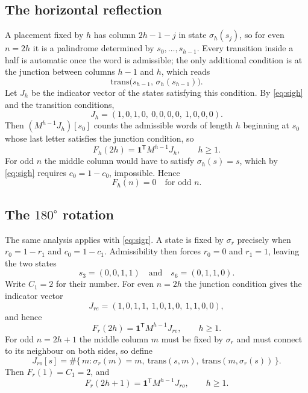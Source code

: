 \documentclass[12pt]{article}
\theoremstyle{definition}
\begin{document}
\subsection{The horizontal reflection}

A placement fixed by $h$ has column $2h-1-j$ in state $\sigma_h(s_j)$, so for
even $n = 2h$ it is a palindrome determined by $s_0, \dots, s_{h-1}$. Every
transition inside a half is automatic once the word is admissible; the only
additional condition is at the junction between columns $h-1$ and $h$, which
reads
\[
\text{trans}\bigl(s_{h-1},\, \sigma_h(s_{h-1})\bigr).
\]
Let $J_h$ be the indicator vector of the states satisfying this condition. By
\eqref{eq:sigh} and the transition conditions,
\[
J_h = (1,0,1,0,\ 0,0,0,0,\ 1,0,0,0).
\]
Then $(M^{h-1} J_h)[s_0]$ counts the admissible words of length $h$ beginning at
$s_0$ whose last letter satisfies the junction condition, so
\begin{equation}
\label{eq:Fh}
F_h(2h) = \mathbf{1}^{\mathsf{T}} M^{h-1} J_h,
\qquad h \ge 1 .
\end{equation}
For odd $n$ the middle column would have to satisfy $\sigma_h(s) = s$, which by
\eqref{eq:sigh} requires $c_0 = 1 - c_0$, impossible. Hence
\begin{equation}
\label{eq:Fhodd}
F_h(n) = 0 \quad \text{for odd } n .
\end{equation}

\subsection{The $180^\circ$ rotation}

The same analysis applies with \eqref{eq:sigr}. A state is fixed by $\sigma_r$
precisely when $r_0 = 1 - r_1$ and $c_0 = 1 - c_1$. Admissibility then forces
$r_0 = 0$ and $r_1 = 1$, leaving the two states
\[
s_3 = (0,0,1,1) \quad \text{and} \quad s_6 = (0,1,1,0).
\]
Write $C_1 = 2$ for their number. For even $n = 2h$ the junction condition gives
the indicator vector
\[
J_{re} = (1,0,1,1,\ 1,0,1,0,\ 1,1,0,0),
\]
and hence
\begin{equation}
\label{eq:Ffre}
F_r(2h) = \mathbf{1}^{\mathsf{T}} M^{h-1} J_{re}, \qquad h \ge 1 .
\end{equation}
For odd $n = 2h+1$ the middle column $m$ must be fixed by $\sigma_r$ and must
connect to its neighbour on both sides, so define
\[
J_{ro}[s] = \# \{\, m : \sigma_r(m) = m,\ \text{trans}(s,m),\ \text{trans}(m,\sigma_r(s)) \,\}.
\]
Then $F_r(1) = C_1 = 2$, and
\begin{equation}
\label{eq:Ffro}
F_r(2h+1) = \mathbf{1}^{\mathsf{T}} M^{h-1} J_{ro}, \qquad h \ge 1 .
\end{equation}
\end{document}
